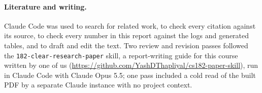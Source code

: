 \documentclass{article}
\newcommand{\code}[1]{\texttt{#1}}
\begin{document}
\paragraph{Literature and writing.} Claude Code was used to search for related work, to check every
citation against its source, to check every number in this report against the logs and generated
tables, and to draft and edit the text. Two review and revision passes followed the
\code{182-clear-research-paper} skill, a report-writing guide for this course written by one of us
(\url{https://github.com/YashDThapliyal/cs182-paper-skill}), run in Claude Code with Claude Opus 5.5;
one pass included a cold read of the built PDF by a separate Claude instance with no project context.
\end{document}

